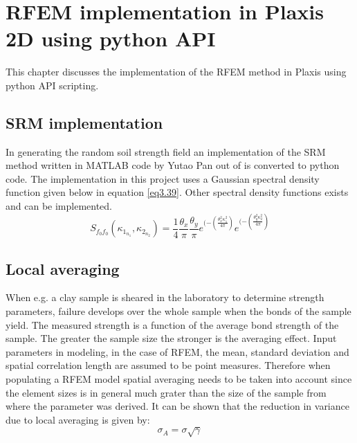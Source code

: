 \chapter[RFEM implementation in Plaxis 2D using python API]{RFEM implementation in Plaxis 2D using python API}
This chapter discusses the implementation of the RFEM method in Plaxis using python API scripting.

\section{SRM implementation}

In generating the random soil strength field an implementation of the SRM method written in MATLAB code by Yutao Pan out of \citet*{deodatis1990stochastic} is converted to python code.
The implementation in this project uses a Gaussian spectral density function given below in equation \ref{eq3.39}. Other spectral density functions exists and can be implemented.
\begin{equation}
\label{eq3.93}
	S_{f_0 f_0}(\kappa_{1_{n_1}},\kappa_{2_{n_2}}) = \frac{1}{4}\frac{\theta_x}{\pi}\frac{\theta_y}{\pi}e^{(-(\frac{\theta_x^2 \kappa_1^2}{4\pi})}e^{(-(\frac{\theta_y^2 \kappa_2^2}{4\pi})}
\end{equation}



\section{Local averaging}

When e.g. a clay sample is sheared in the laboratory to determine strength parameters, failure develops over the whole sample when the bonds of the sample yield. The measured strength is a function of the average bond strength of the sample. The greater the sample size the stronger is the averaging effect.
Input parameters in modeling, in the case of RFEM, the mean, standard deviation and spatial correlation length are assumed to be point measures. 
Therefore when populating a RFEM model spatial averaging needs to be taken into account since the element sizes is in general much grater than the size of the sample from where the parameter was derived.
It can be shown \citep*{vanmarcke2010random} that the reduction in variance due to local averaging is given by:
\begin{equation}
\label{eq3.39}
	\sigma_A = \sigma \sqrt{\gamma} 
\end{equation}


